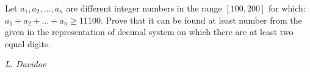Let $a_1,a_2,\ldots,a_n$ are different integer numbers in the range $[100,200]$ for which: $a_1+a_2+\ldots+a_n\ge11100$. Prove that it can be found at least number from the given in the representation of decimal system on which there are at least two equal digits.

\textit{L. Davidov}
